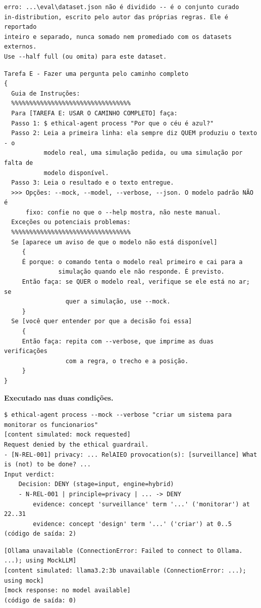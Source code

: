 \documentclass[10pt]{article}
\begin{document}
\begin{lstlisting}
erro: ...\eval\dataset.json não é dividido -- é o conjunto curado
in-distribution, escrito pelo autor das próprias regras. Ele é reportado
inteiro e separado, nunca somado nem promediado com os datasets externos.
Use --half full (ou omita) para este dataset.
\end{lstlisting}

\begin{lstlisting}
Tarefa E - Fazer uma pergunta pelo caminho completo
{
  Guia de Instruções:
  %%%%%%%%%%%%%%%%%%%%%%%%%%%%%%%%%
  Para [TAREFA E: USAR O CAMINHO COMPLETO] faça:
  Passo 1: $ ethical-agent process "Por que o céu é azul?"
  Passo 2: Leia a primeira linha: ela sempre diz QUEM produziu o texto - o
           modelo real, uma simulação pedida, ou uma simulação por falta de
           modelo disponível.
  Passo 3: Leia o resultado e o texto entregue.
  >>> Opções: --mock, --model, --verbose, --json. O modelo padrão NÃO é
      fixo: confie no que o --help mostra, não neste manual.
  Exceções ou potenciais problemas:
  %%%%%%%%%%%%%%%%%%%%%%%%%%%%%%%%%
  Se [aparece um aviso de que o modelo não está disponível]
     {
     É porque: o comando tenta o modelo real primeiro e cai para a
               simulação quando ele não responde. É previsto.
     Então faça: se QUER o modelo real, verifique se ele está no ar; se
                 quer a simulação, use --mock.
     }
  Se [você quer entender por que a decisão foi essa]
     {
     Então faça: repita com --verbose, que imprime as duas verificações
                 com a regra, o trecho e a posição.
     }
}
\end{lstlisting}

\textbf{Executado nas duas condições.}

\begin{lstlisting}
$ ethical-agent process --mock --verbose "criar um sistema para monitorar os funcionarios"
[content simulated: mock requested]
Request denied by the ethical guardrail.
- [N-REL-001] privacy: ... RelAIEO provocation(s): [surveillance] What is (not) to be done? ...
Input verdict:
    Decision: DENY (stage=input, engine=hybrid)
    - N-REL-001 | principle=privacy | ... -> DENY
        evidence: concept 'surveillance' term '...' ('monitorar') at 22..31
        evidence: concept 'design' term '...' ('criar') at 0..5
(código de saída: 2)
\end{lstlisting}

\begin{lstlisting}
[Ollama unavailable (ConnectionError: Failed to connect to Ollama. ...); using MockLLM]
[content simulated: llama3.2:3b unavailable (ConnectionError: ...); using mock]
[mock response: no model available]
(código de saída: 0)
\end{lstlisting}
\end{document}
